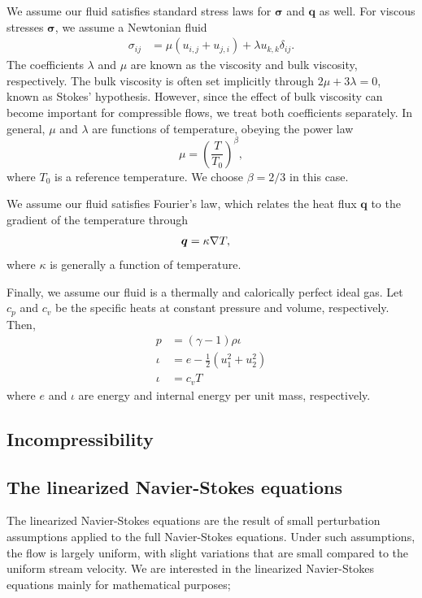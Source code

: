 We assume our fluid satisfies standard stress laws for $\boldsymbol \sigma$ and $\boldsymbol q$ as well. For viscous stresses $\boldsymbol \sigma$, we assume a Newtonian fluid
\begin{align*}
\sigma_{ij} &= \mu(u_{i,j}+u_{j,i}) + \lambda u_{k,k}\delta_{ij}.
\end{align*}
The coefficients $\lambda$ and $\mu$ are known as the viscosity and bulk viscosity, respectively. The bulk viscosity is often set implicitly through $2\mu + 3\lambda = 0$, known as Stokes' hypothesis. However, since the effect of bulk viscosity can become important for compressible flows, we treat both coefficients separately. In general, $\mu$ and $\lambda$ are functions of temperature, obeying the power law
\[
\mu = \left(\frac{T}{T_0}\right)^\beta,
\]
where $T_0$ is a reference temperature. We choose $\beta = 2/3$ in this case. 

We assume our fluid satisfies Fourier's law, which relates the heat flux $\boldsymbol q$ to the gradient of the temperature through
\begin{align*}
{\boldsymbol q} &= \kappa \grad T,
\end{align*}
where $\kappa$ is generally a function of temperature. 

Finally, we assume our fluid is a thermally and calorically perfect ideal gas. Let $c_p$ and $c_v$ be the specific heats at constant pressure and volume, respectively. Then,
\begin{align*}
p &= (\gamma-1)\rho\iota\\
\iota &= e-\frac{1}{2}(u_1^2+u_2^2)\\
\iota &= c_vT
\end{align*}
where $e$ and $\iota$ are energy and internal energy per unit mass, respectively. 


\subsection{Incompressibility}

\cite{stokesDPG}

\subsection{The linearized Navier-Stokes equations}

The linearized Navier-Stokes equations are the result of small perturbation assumptions applied to the full Navier-Stokes equations. Under such assumptions, the flow is largely uniform, with slight variations that are small compared to the uniform stream velocity. We are interested in the linearized Navier-Stokes equations mainly for mathematical purposes; 

